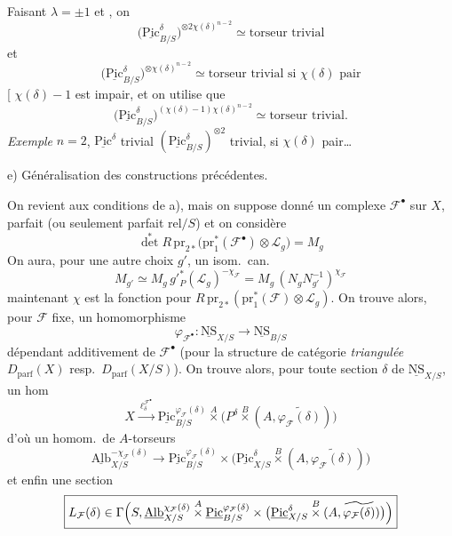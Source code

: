 \documentclass[11pt,a4paper]{article}
\begin{document}
Faisant $\lambda = \pm 1$ et , on  \ill{}
\[
\bigl(\underline{\mathrm{Pic}}^{\delta}_{B/S}\bigr)^{\otimes 2\chi(\delta)^{n-2}}
\simeq \text{torseur trivial}
\]
et 
\[
\bigl(\underline{\mathrm{Pic}}^{\delta}_{B/S}\bigr)^{\otimes \chi(\delta)^{n-2}}
\simeq \text{torseur trivial si $\chi(\delta)$ pair}
\]
[ $\chi(\delta) - 1$ est impair, et on utilise que
\[
\bigl(\underline{\mathrm{Pic}}^{\delta}_{B/S}\bigr)^{(\chi(\delta)-1)\chi(\delta)^{n-2}}
\simeq \text{torseur trivial}.
\]
\emph{Exemple}  $n = 2$, \ill{} $\underline{\mathrm{Pic}}^{\delta}$
trivial  $(\underline{\mathrm{Pic}}^{\delta}_{B/S})^{\otimes 2}$
trivial, si $\chi(\delta)$ pair\ldots


e) Généralisation des constructions précédentes.

On revient aux conditions de a), mais on suppose donné un complexe
 $\mathcal{F}^{\bullet}$ sur $X$, 
parfait (ou seulement parfait rel$/S$) et on considère
\[
{\det}^{*} R\,\mathrm{pr}_{2*}\bigl(\mathrm{pr}_1^{*}(\mathcal{F}^{\bullet}) \otimes \mathcal{L}_g\bigr) = M_g
\]
On aura, pour une autre choix $g'$,  un isom.\ can.
\[
M_{g'} \simeq M_g\, g'^{*}_{P}(\mathcal{L}_g)^{-\chi_{\mathcal{F}}}
= M_g\, (N_g N_{g'}^{-1})^{\chi_{\mathcal{F}}}
\]
\ill{} maintenant $\chi$ est la fonction  \ill{} pour
$R\,\mathrm{pr}_{2*}(\mathrm{pr}_1^{*}(\mathcal{F}) \otimes \mathcal{L}_g)$.
On trouve alors, pour $\mathcal{F}$ fixe, un homomorphisme
\[
\varphi_{\mathcal{F}^{\bullet}} : \underline{\mathrm{NS}}_{X/S} \longrightarrow \underline{\mathrm{NS}}_{B/S}
\]
dépendant additivement de $\mathcal{F}^{\bullet}$ (pour la structure de
catégorie \emph{triangulée}  $D_{\mathrm{parf}}(X)$ resp.\
$D_{\mathrm{parf}}(X/S)$). On trouve alors, pour toute section $\delta$ de
$\underline{\mathrm{NS}}_{X/S}$, un hom
\[
X \xrightarrow{\ \ell^{\mathcal{F}^{\bullet}}_{\delta}\ }
\underline{\mathrm{Pic}}^{\varphi_{\mathcal{F}}(\delta)}_{B/S} \overset{A}{\times}
\bigl(P^{\delta} \overset{B}{\times} (A, \widetilde{\varphi_{\mathcal{F}}(\delta)})\bigr)
\]
d'où un homom.\ de $A$-torseurs
\[
\underline{\mathrm{Alb}}^{-\chi_{\mathcal{F}}(\delta)}_{X/S} \longrightarrow
\underline{\mathrm{Pic}}^{\varphi_{\mathcal{F}}(\delta)}_{B/S} \times
\bigl(\underline{\mathrm{Pic}}^{\delta}_{X/S} \overset{B}{\times} (A, \widetilde{\varphi_{\mathcal{F}}(\delta)})\bigr)
\]
et enfin une section
\[
\boxed{L_{\mathcal{F}}(\delta) \in \Gamma\Bigl(S, \underline{\mathrm{Alb}}^{\chi_{\mathcal{F}}(\delta)}_{X/S}
\overset{A}{\times} \underline{\mathrm{Pic}}^{\varphi_{\mathcal{F}}(\delta)}_{B/S}
\times \bigl(\underline{\mathrm{Pic}}^{\delta}_{X/S} \overset{B}{\times} (A, \widetilde{\varphi_{\mathcal{F}}(\delta)})\bigr)\Bigr)}
\]
\end{document}
